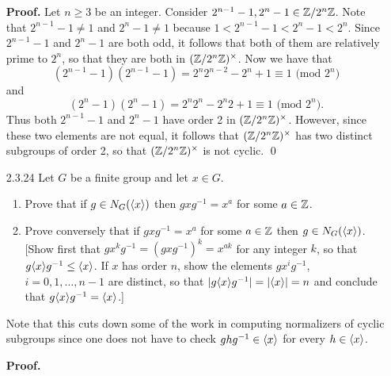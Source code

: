\begin{enumerate}
      \textbf{Proof.} Let $n \ge 3$ be an integer. Consider
      $2^{n-1}-1, 2^n-1 \in \mathbb{Z}/2^n\mathbb{Z}$. Note that $2^{n-1}-1 \neq 1$ and
      $2^n-1 \neq 1$ because $1 < 2^{n-1}-1 < 2^n-1 < 2^n$. Since $2^{n-1}-1$
      and $2^n-1$ are both odd, it follows that both of them are relatively
      prime to $2^n$, so that they are both in $(\mathbb{Z}/2^n\mathbb{Z})^\times$. Now we have
      that
      $$(2^{n-1}-1)(2^{n-1}-1) = 2^n2^{n-2}-2^n + 1 \equiv 1\text{ (mod }2^n)$$
      and
      $$(2^n-1)(2^n-1) = 2^n2^n-2^n2 + 1 \equiv 1\text{ (mod }2^n).$$
      Thus both $2^{n-1}-1$ and $2^n-1$ have order 2 in $(\mathbb{Z}/2^n\mathbb{Z})^\times$.
      However, since these two elements are not equal, it follows that
      $(\mathbb{Z}/2^n\mathbb{Z})^\times$ has two distinct subgroups of order 2, so that
      $(\mathbb{Z}/2^n\mathbb{Z})^\times$ is not cyclic. \qed
   \item[2.3.24]  Let $G$ be a finite group and let $x \in G$.
                  \begin{enumerate}
                     \item Prove that if $g \in N_G(\langle x \rangle)$ then
                           $gxg^{-1} = x^a$ for some $a \in \mathbb{Z}$. 
                     \item Prove conversely that if $gxg^{-1} = x^a$ for some
                           $a \in \mathbb{Z}$ then $g \in N_G(\langle x \rangle)$. [Show first
                           that $gx^kg^{-1} = (gxg^{-1})^k = x^{ak}$ for any
                           integer $k$, so that $g\langle x \rangle g^{-1} \le \langle x \rangle$.
                           If $x$ has order $n$, show the elements $gx^ig^{-1}$,
                           $i = 0, 1, \ldots, n-1$ are distinct, so that
                           $|g\langle x \rangle g^{-1}| = |\langle x \rangle| = n$ and conclude that
                           $g\langle x \rangle g^{-1} = \langle x \rangle$.]
                  \end{enumerate}
                  Note that this cuts down some of the work in computing
                  normalizers of cyclic subgroups since one does not have to
                  check $ghg^{-1} \in \langle x \rangle$ for every $h \in \langle x \rangle$.

      \textbf{Proof.}


\end{enumerate}

